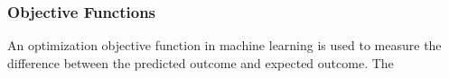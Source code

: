 \subsubsection{Objective Functions}
An optimization objective function in machine learning is used to measure the difference between the predicted outcome and expected outcome. The 